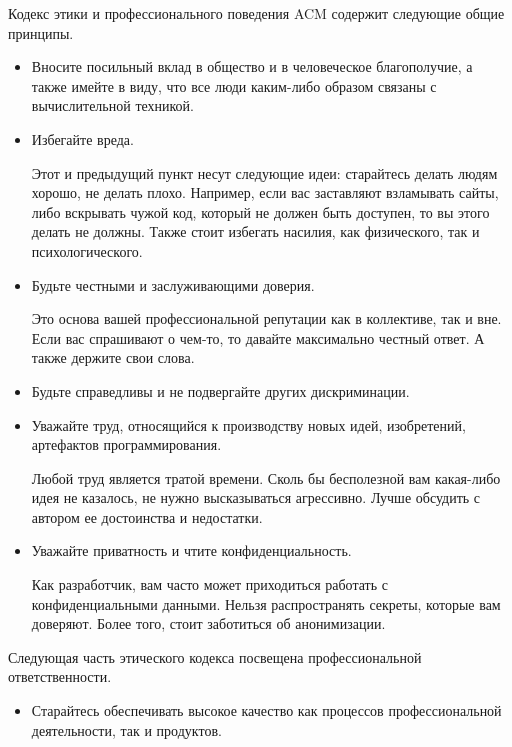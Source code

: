     \begin{Rem}
        Кодекс этики и профессионального поведения ACM содержит следующие общие принципы.
        \begin{itemize}
            \item Вносите посильный вклад в общество и в человеческое благополучие, а также имейте в виду, что все люди каким-либо образом связаны с вычислительной техникой. 
            
            \item Избегайте вреда.
            
            Этот и предыдущий пункт несут следующие идеи: старайтесь делать людям хорошо, не делать плохо. Например, если вас заставляют взламывать сайты, либо вскрывать чужой код, который не должен быть доступен, то вы этого делать не должны. Также стоит избегать насилия, как физического, так и психологического.

            \item Будьте честными и заслуживающими доверия. 
            
            Это основа вашей профессиональной репутации как в коллективе, так и вне. Если вас спрашивают о чем-то, то давайте максимально честный ответ. А также держите свои слова.

            \item Будьте справедливы и не подвергайте других дискриминации.

            \item Уважайте труд, относящийся к производству новых идей, изобретений, артефактов программирования. 

            Любой труд является тратой времени. Сколь бы бесполезной вам какая-либо идея не казалось, не нужно высказываться агрессивно. Лучше обсудить с автором ее достоинства и недостатки. 

            \item Уважайте приватность и чтите конфиденциальность. 

            Как разработчик, вам часто может приходиться работать с конфиденциальными данными. Нельзя распространять секреты, которые вам доверяют. Более того, стоит заботиться об анонимизации.
        \end{itemize}

        Следующая часть этического кодекса посвещена профессиональной ответственности.
        \begin{itemize}
            \item Старайтесь обеспечивать высокое качество как процессов профессиональной деятельности, так и продуктов.


\end{itemize}
\end{Rem}
